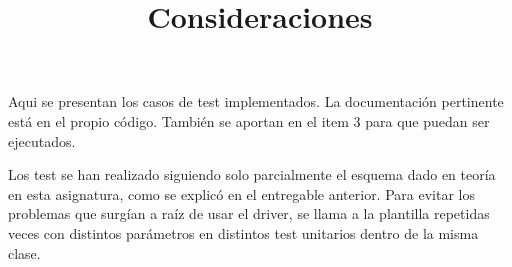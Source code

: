 \documentclass[a4paper]{article}
\title{Consideraciones}
\date{}
\begin{document}
\setlength{\voffset}{-1in}
\setlength{\textheight}{680px}
\setlength{\headsep}{30px}
\maketitle

Aqui se presentan los casos de test implementados. La documentación pertinente está en el propio código. También se aportan en el item 3 para que puedan ser ejecutados.

Los test se han realizado siguiendo solo parcialmente el esquema dado en teoría en esta asignatura, como se explicó en el entregable anterior. Para evitar los problemas que surgían a raíz de usar el driver, se llama a la plantilla repetidas veces con distintos parámetros en distintos test unitarios dentro de la misma clase.
\end{document}
